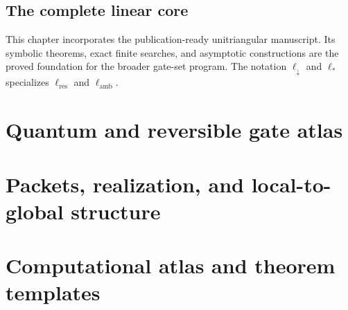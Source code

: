 \documentclass[11pt,openany]{book}
\numberwithin{equation}{chapter}
\theoremstyle{definition}
\theoremstyle{remark}
\newcommand{\ellDown}{\ell_{\downarrow}}
\newcommand{\ellAll}{\ell_{*}}
\newcommand{\ellRes}{\ell_{\mathrm{res}}}
\newcommand{\ellAmb}{\ell_{\mathrm{amb}}}
\begin{document}
\chapter{The complete linear core}\label{ch:linear-core}
\begin{boundarybox}
This chapter incorporates the publication-ready unitriangular manuscript.  Its symbolic theorems, exact finite searches, and asymptotic constructions are the proved foundation for the broader gate-set program.  The notation $\ellDown$ and $\ellAll$ specializes $\ellRes$ and $\ellAmb$.
\end{boundarybox}


\part{Quantum and reversible gate atlas}







\part{Packets, realization, and local-to-global structure}


\part{Computational atlas and theorem templates}




\appendix





\backmatter

\printindex
\end{document}
